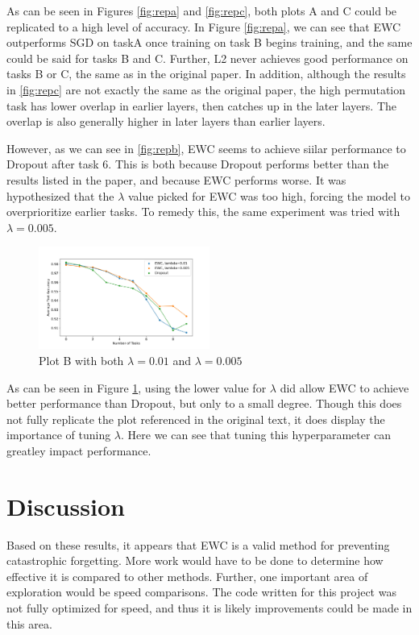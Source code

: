 \documentclass{article}
\begin{document}
As can be seen in Figures \ref{fig:repa} and \ref{fig:repc}, both plots A and C could be replicated to a high level of accuracy. In Figure \ref{fig:repa}, we can see that EWC outperforms SGD on taskA once training on task B begins training, and the same could be said for tasks B and C. Further, L2 never achieves good performance on tasks B or C, the same as in the original paper. In addition, although the results in \ref{fig:repc} are not exactly the same as the original paper, the high permutation task has lower overlap in earlier layers, then catches up in the later layers. The overlap is also generally higher in later layers than earlier layers.

However, as we can see in \ref{fig:repb}, EWC seems to achieve siilar performance to Dropout after task 6. This is both because Dropout performs better than the results listed in the paper, and because EWC performs worse. It was hypothesized that the $\lambda$ value picked for EWC was too high, forcing the model to overprioritize earlier tasks. To remedy this, the same experiment was tried with $\lambda=0.005$.

\begin{figure}[!h]
\centering
\includegraphics[width=0.5\textwidth]{../Figures/Plot_b2.jpg}
\caption{Plot B with both $\lambda=0.01$ and $\lambda=0.005$}
\label{fig:repb2}
\end{figure}

As can be seen in Figure \ref{fig:repb2}, using the lower value for $\lambda$ did allow EWC to achieve better performance than Dropout, but only to a small degree. Though this does not fully replicate the plot referenced in the original text, it does display the importance of tuning $\lambda$. Here we can see that tuning this hyperparameter can greatley impact performance. 


\section{Discussion}

Based on these results, it appears that EWC is a valid method for preventing catastrophic forgetting. More work would have to be done to determine how effective it is compared to other methods. Further, one important area of exploration would be speed comparisons. The code written for this project was not fully optimized for speed, and thus it is likely improvements could be made in this area.





\end{document}
